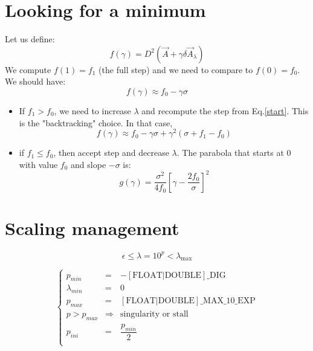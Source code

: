 \documentclass[aps,12pt]{revtex4}
\begin{document}
\section{Looking for a minimum}
Let us define:
\begin{equation}
	f(\gamma)  =  D^2(\vec{A}+\gamma \delta\vec{A}_\lambda)
\end{equation}
We compute $f(1)=f_1$ (the full step) and we need to compare to $f(0)=f_0$.
We should have:
\begin{equation}
	f(\gamma) \approx f_0 - \gamma \sigma %
\end{equation}

\begin{itemize}
\item If $f_1>f_0$, we need to increase $\lambda$ and recompute the step from Eq.\eqref{start}. This is the "backtracking" choice.
In that case, 
\begin{equation}
		f(\gamma) \approx f_0 - \gamma \sigma + \gamma^2 \left(\sigma+f_1-f_0\right)
\end{equation}

\item if $f_1\leq f_0$, then accept step and decrease $\lambda$.
The parabola that starts at $0$ with value $f_0$ and slope $-\sigma$ is:
\begin{equation}
	g(\gamma) = \dfrac{\sigma^2}{4f_0}\left[\gamma - \dfrac{2f_0}{\sigma}\right]^2
\end{equation}
\end{itemize}

\section{Scaling management}

\begin{equation}
	\epsilon \leq \lambda = 10^p < \lambda_{\max}
\end{equation}

\begin{equation}
\left\lbrace
\begin{array}{lcl}
	p_{min}  & =  &-\mathrm{[FLOAT|DOUBLE]\_DIG}\\
	\lambda_{min} & = & 0\\
 	\hline
	p_{max} & = &  \mathrm{[FLOAT|DOUBLE]\_MAX\_10\_EXP}\\
	p>p_{max}& \Rightarrow & \text{singularity or stall}\\
	\hline
	p_{ini} & = & \dfrac{p_{min}}{2}\\
\end{array}
\right.
\end{equation}
\end{document}
